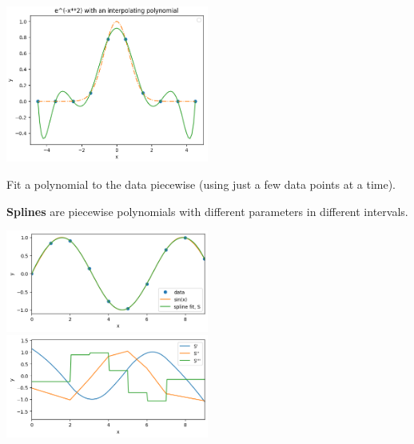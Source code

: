 \documentclass[12pt,letterpaper,noanswers]{exam}
\begin{document}
\includegraphics[width=0.5\textwidth]{img/C08gaussinterp.png}

\begin{tcolorbox}
Fit a polynomial to the data piecewise (using just a few data points at a time).

\textbf{Splines} are piecewise polynomials with different parameters in different intervals.
\end{tcolorbox}


\includegraphics[width=0.5\textwidth]{img/Class09sinspline.png}
\includegraphics[width=0.5\textwidth]{img/Class09deriv.png}
\end{document}

